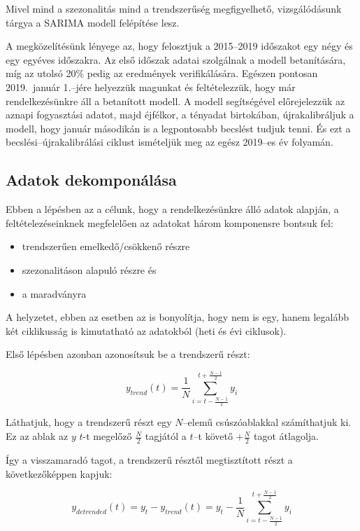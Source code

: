 Mivel mind a szezonalitás mind a trendszerűség megfigyelhető, vizsgálódásunk tárgya a SARIMA modell
felépítése lesz.

A megközelítésünk lényege az, hogy felosztjuk a 2015--2019 időszakot egy négy és egy egyéves
időszakra. Az első időszak adatai szolgálnak a modell betanítására, míg az utolsó 20\% pedig az
eredmények verifikálására. Egészen pontosan 2019.\ január 1.--jére helyezzük magunkat és
feltételezzük, hogy már rendelkezésünkre áll a betanított modell. A modell segítségével
előrejelezzük az aznapi fogyasztási adatot, majd éjfélkor, a tényadat birtokában, újrakalibráljuk a
modell, hogy január másodikán is a legpontosabb becslést tudjuk tenni. És ezt a
becslési--újrakalibrálási ciklust ismételjük meg az egész 2019--es év folyamán.

\subsection{Adatok dekomponálása}

Ebben a lépésben az a célunk, hogy a rendelkezésünkre álló adatok alapján, a feltételezéseinknek
megfelelően az adatokat három komponensre bontsuk fel:

\begin{itemize}
    \item trendszerűen emelkedő/csökkenő részre
    \item szezonalitáson alapuló részre és
    \item a maradványra
\end{itemize}

A helyzetet, ebben az esetben az is bonyolítja, hogy nem is egy, hanem legalább két ciklikusság is
kimutatható az adatokból (heti és évi ciklusok).

Első lépésben azonban azonosítsuk be a trendszerű részt:

\begin{equation}
    y_{trend}(t) = \frac{1}{N} \sum_{i=t-\frac{N-1}{2}}^{t+\frac{N-1}{2}} y_i
\end{equation}

Láthatjuk, hogy a trendszerű részt egy $N$--elemű csúszóablakkal számíthatjuk ki. Ez az ablak az
$y$ $t$-t megelőző $\frac{N}{2}$ tagjától a $t$--t követő $+\frac{N}{2}$ tagot átlagolja.

Így a visszamaradó tagot, a trendszerű résztől megtisztított részt a következőképpen kapjuk:

\begin{equation}
    y_{detrended}(t) = y_t - y_{trend}(t) = y_t - \frac{1}{N} \sum_{i=t-\frac{N-1}{2}}^{t+\frac{N-1}{2}} y_i
\end{equation}

